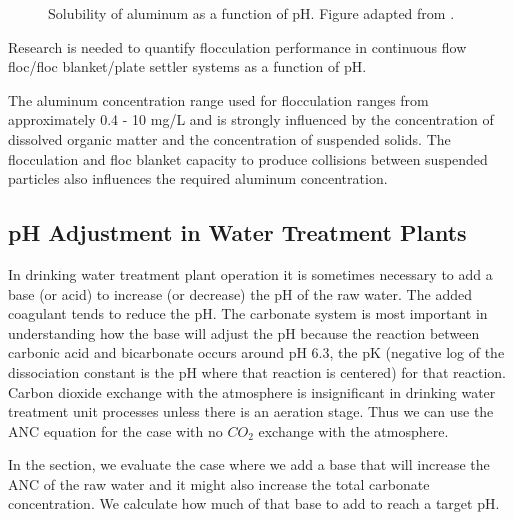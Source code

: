 \documentclass[letterpaper,10pt,english]{sphinxmanual}
\let\sphinxpxdimen\pdfpxdimen\else\newdimen\sphinxpxdimen
\begin{document}
\begin{figure}[htbp]
\centering
\capstart

\noindent\sphinxincludegraphics[width=600\sphinxpxdimen]{{Al_solubility}.png}
\caption{Solubility of aluminum as a function of pH. Figure adapted from .}\label{\detokenize{Rapid_Mix/RM_Intro:id4}}\label{\detokenize{Rapid_Mix/RM_Intro:figure-al-solubility}}\end{figure}

Research is needed to quantify flocculation performance in continuous flow floc/floc blanket/plate settler systems as a function of pH.

The aluminum concentration range used for flocculation ranges from approximately 0.4 - 10 mg/L and is strongly influenced by the concentration of dissolved organic matter and the concentration of suspended solids. The flocculation and floc blanket capacity to produce collisions between suspended particles also influences the required aluminum concentration.


\subsection{pH Adjustment in Water Treatment Plants}
\label{\detokenize{Rapid_Mix/RM_Intro:ph-adjustment-in-water-treatment-plants}}\label{\detokenize{Rapid_Mix/RM_Intro:heading-ph-adjustment-in-water-treatment-plants}}
In drinking water treatment plant operation it is sometimes necessary to add a base (or acid) to increase (or decrease) the pH of the raw water. The added coagulant tends to reduce the pH. The carbonate system is most important in understanding how the base will adjust the pH because the reaction between carbonic acid and bicarbonate occurs around pH 6.3, the pK (negative log of the dissociation constant is the pH where that reaction is centered) for that reaction. Carbon dioxide exchange with the atmosphere is insignificant in drinking water treatment unit processes unless there is an aeration stage. Thus we can use the ANC equation for the case with no \(CO_2\) exchange with the atmosphere.

In the section, {\hyperref[\detokenize{Rapid_Mix/RM_Derivations:heading-ph-adjustment}]{}} we evaluate the case where we add a base that will increase the ANC of the raw water and it might also increase the total carbonate concentration. We calculate how much of that base to add to reach a target pH.
\end{document}

